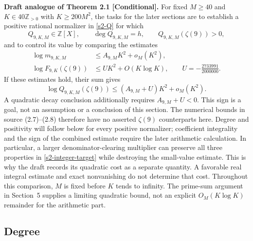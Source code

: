 \noindent\textbf{Draft analogue of Theorem 2.1 [Conditional].}
For fixed $M\geq40$ and $K\in40\mathbb Z_{>0}$ with $K\geq200M^2$,
the tasks for the later sections are to establish a positive rational
normalizer in \eqref{s2-Q} for which
\begin{equation}
 Q_{9,K,M}\in\mathbb Z[X],\qquad
 \deg Q_{9,K,M}=h,\qquad Q_{9,K,M}(\zeta(9))>0,
 \label{s2-integer-target}
\end{equation}
and to control its value by comparing the estimates
\begin{align}
 \log m_{9,K,M}&\leq A_{9,M}K^2+o_M(K^2),
 \label{s2-arithmetic-target}\\
 \log F_{9,K}(\zeta(9))&\leq U K^2+O(K\log K),
 \qquad U=-\frac{2733991}{2000000}.
 \label{s2-real-target}
\end{align}
If these estimates hold, their sum gives
\begin{equation}
 \log Q_{9,K,M}(\zeta(9))
 \leq (A_{9,M}+U)K^2+o_M(K^2).
 \label{s2-combined-target}
\end{equation}
A quadratic decay conclusion additionally requires $A_{9,M}+U<0$.
This sign is a goal, not an assumption or a conclusion of this section.
The numerical bounds in source (2.7)--(2.8) therefore have no asserted
$\zeta(9)$ counterparts here.  Degree and positivity will follow below
for every positive normalizer; coefficient integrality and the sign of
the combined estimate require the later arithmetic calculation.
In particular, a larger denominator-clearing multiplier can preserve
all three properties in \eqref{s2-integer-target} while destroying the
small-value estimate.  This is why the draft records its quadratic cost
as a separate quantity.  A favorable real integral estimate and exact
nonvanishing do not determine that cost.  Throughout this comparison,
$M$ is fixed before $K$ tends to infinity. The prime-sum argument in
Section~5 supplies a limiting quadratic bound, not an explicit
$O_M(K\log K)$ remainder for the arithmetic part.

\subsection{Degree}
\label{s2-degree}

